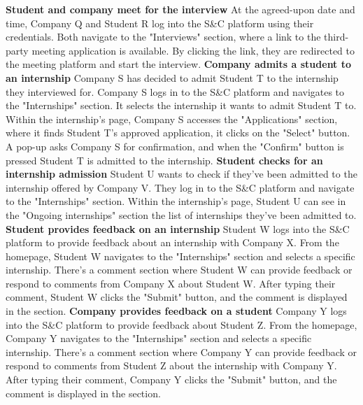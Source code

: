 \newline
\textbf{Student and company meet for the interview}\newline
At the agreed-upon date and time, Company Q and Student R log into the S\&C platform using their credentials. Both navigate to the "Interviews" section, where a link to the third-party meeting application is available. By clicking the link, they are redirected to the meeting platform and start the interview.
\newline
\newline
\textbf{Company admits a student to an internship}\newline
Company S has decided to admit Student T to the internship they interviewed for. Company S logs in to the S\&C platform and navigates to the "Internships" section. It selects the internship it wants to admit Student T to. Within the internship's page, Company S accesses the "Applications" section, where it finds Student T's approved application, it clicks on the "Select" button. A pop-up asks Company S for confirmation, and when the "Confirm" button is pressed Student T is admitted to the internship.
\newline
\newline
\textbf{Student checks for an internship admission} \newline
Student U wants to check if they've been admitted to the internship offered by Company V. They log in to the S\&C platform and navigate to the "Internships" section. Within the internship's page, Student U can see in the "Ongoing internships" section the list of internships they've been admitted to.
\newline
\newline
\textbf{Student provides feedback on an internship}\newline
Student W logs into the S\&C platform to provide feedback about an internship with Company X. From the homepage, Student W navigates to the "Internships" section and selects a specific internship. There's a comment section where Student W can provide feedback or respond to comments from Company X about Student W. After typing their comment, Student W clicks the "Submit" button, and the comment is displayed in the section.
\newline
\newline
\textbf{Company provides feedback on a student}\newline
Company Y logs into the S\&C platform to provide feedback about Student Z. From the homepage, Company Y navigates to the "Internships" section and selects a specific internship. There's a comment section where Company Y can provide feedback or respond to comments from Student Z about the internship with Company Y. After typing their comment, Company Y clicks the "Submit" button, and the comment is displayed in the section.

